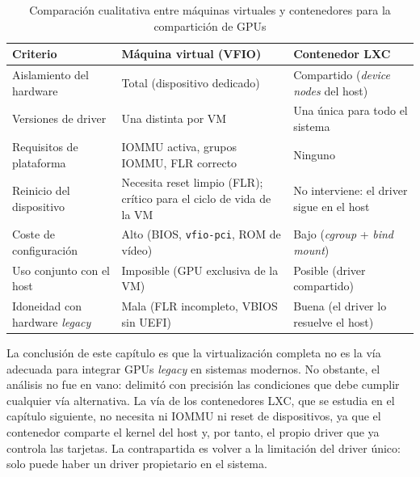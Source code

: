 \begin{table}[htbp]
\centering
\singlespacing
\footnotesize
\setlength{\tabcolsep}{4pt}
\begin{tabularx}{\textwidth}{|>{\raggedright\arraybackslash}p{2.7cm}|>{\raggedright\arraybackslash}X|>{\raggedright\arraybackslash}X|}
\hline
\textbf{Criterio} & \textbf{Máquina virtual (VFIO)} & \textbf{Contenedor LXC} \\
\hline
Aislamiento del hardware & Total (dispositivo dedicado) & Compartido (\textit{device nodes} del host) \\
\hline
Versiones de driver & Una distinta por VM & Una única para todo el sistema \\
\hline
Requisitos de plataforma & IOMMU activa, grupos IOMMU, FLR correcto & Ninguno \\
\hline
Reinicio del dispositivo & Necesita reset limpio (FLR); crítico para el ciclo de vida de la VM & No interviene: el driver sigue en el host \\
\hline
Coste de configuración & Alto (BIOS, \texttt{vfio-pci}, ROM de vídeo) & Bajo (\textit{cgroup} + \textit{bind mount}) \\
\hline
Uso conjunto con el host & Imposible (GPU exclusiva de la VM) & Posible (driver compartido) \\
\hline
Idoneidad con hardware \textit{legacy} & Mala (FLR incompleto, VBIOS sin UEFI) & Buena (el driver lo resuelve el host) \\
\hline
\end{tabularx}
\caption{Comparación cualitativa entre máquinas virtuales y contenedores para la compartición de GPUs}
\label{tab:vm-lxc}
\end{table}

La conclusión de este capítulo es que la virtualización completa no es la vía adecuada para integrar GPUs 
\textit{legacy} en sistemas modernos. No obstante, el análisis no fue en vano: delimitó con precisión 
las condiciones que debe cumplir cualquier vía alternativa. La vía de los contenedores LXC, que se estudia en 
el capítulo siguiente, no necesita ni IOMMU ni reset de dispositivos, ya que el contenedor comparte el kernel 
del host y, por tanto, el propio driver que ya controla las tarjetas. La contrapartida es volver a la limitación 
del driver único: solo puede haber un driver propietario en el sistema. 


